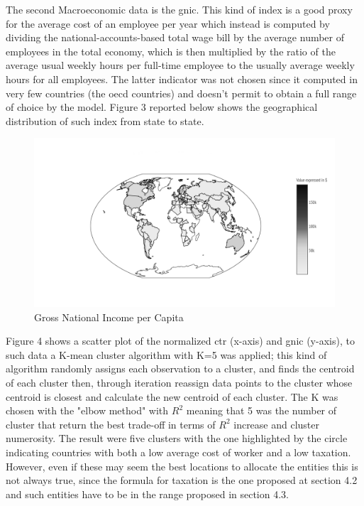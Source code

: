 \begin{doublespace}
The second Macroeconomic data is the \gls{gnic}. This kind of index is a good proxy for the average cost of an employee per year which instead is computed by dividing the national-accounts-based total wage bill by the average number of employees in the total economy, which is then multiplied by the ratio of the average usual weekly hours per full-time employee to the usually average weekly hours for all employees. The latter indicator was not chosen since it computed in very few countries (the \gls{oecd} countries) and doesn't permit to obtain a full range of choice by the model. Figure 3 reported below shows the geographical distribution of such index from state to state.
\begin{figure}
  \centering
  \includegraphics[width=1\linewidth]{Images/GNIworld.png}
  \caption{Gross National Income per Capita}
  \label{fig:test2}
\end{figure}

Figure 4 shows a scatter plot of the normalized \gls{ctr} (x-axis) and \gls{gnic} (y-axis), to such data a  K-mean cluster algorithm with K=5 was applied; this kind of algorithm randomly assigns each observation to a cluster, and finds the centroid of each cluster then, through iteration reassign data points to the cluster whose centroid is closest and calculate the new centroid of each cluster. The K was chosen with the "elbow method" with $R^2$ meaning that 5 was the number of cluster that return the best trade-off in terms of $R^2$ increase and cluster numerosity.
The result were five clusters with the one highlighted by the circle indicating countries with both a low average cost of worker and a low taxation. However, even if these may seem the best locations to allocate the entities this is not always true, since the formula for taxation is the one proposed at section 4.2 and such entities have to be in the range proposed in section 4.3.


\end{doublespace}
